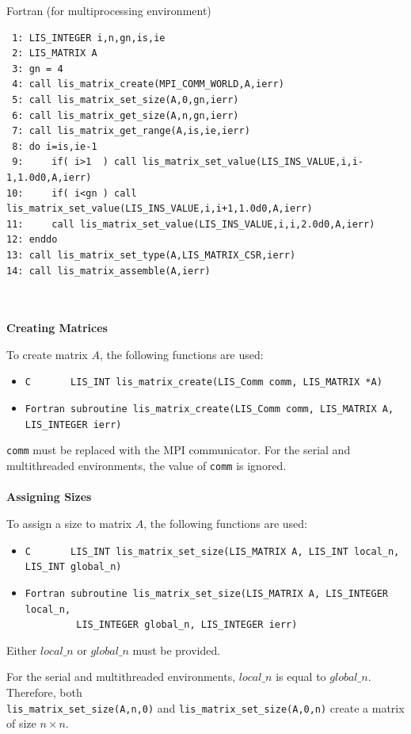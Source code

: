 \documentclass[a4paper]{article}
\begin{document}
\begin{itembox}[l]{Fortran (for multiprocessing environment)}
\small
\begin{verbatim}
 1: LIS_INTEGER i,n,gn,is,ie                 
 2: LIS_MATRIX A
 3: gn = 4
 4: call lis_matrix_create(MPI_COMM_WORLD,A,ierr)
 5: call lis_matrix_set_size(A,0,gn,ierr)
 6: call lis_matrix_get_size(A,n,gn,ierr)
 7: call lis_matrix_get_range(A,is,ie,ierr)
 8: do i=is,ie-1
 9:     if( i>1  ) call lis_matrix_set_value(LIS_INS_VALUE,i,i-1,1.0d0,A,ierr)
10:     if( i<gn ) call lis_matrix_set_value(LIS_INS_VALUE,i,i+1,1.0d0,A,ierr)
11:     call lis_matrix_set_value(LIS_INS_VALUE,i,i,2.0d0,A,ierr)
12: enddo
13: call lis_matrix_set_type(A,LIS_MATRIX_CSR,ierr)
14: call lis_matrix_assemble(A,ierr)
\end{verbatim}
\end{itembox}
\\ \\
\noindent
{\bf Creating Matrices}

To create matrix $A$, the following functions are used: 
\begin{itemize}
\item \verb|C       LIS_INT lis_matrix_create(LIS_Comm comm, LIS_MATRIX *A)|
\item \verb|Fortran subroutine lis_matrix_create(LIS_Comm comm, LIS_MATRIX A, LIS_INTEGER ierr)|
\end{itemize}
{\tt comm} must be replaced with the MPI communicator. 
For the serial and multithreaded environments, the value of {\tt comm} is ignored.
\\ \\
\noindent
{\bf Assigning Sizes}

To assign a size to matrix $A$, the following functions are used: 
\begin{itemize}
\item \verb|C       LIS_INT lis_matrix_set_size(LIS_MATRIX A, LIS_INT local_n, LIS_INT global_n)|
\item \verb|Fortran subroutine lis_matrix_set_size(LIS_MATRIX A, LIS_INTEGER local_n,|\\
      \verb|         LIS_INTEGER global_n, LIS_INTEGER ierr)|
\end{itemize}
Either $local\_n$ or $global\_n$ must be provided. 

For the serial and multithreaded environments, $local\_n$ is
equal to $global\_n$. 
Therefore, both \\
\verb|lis_matrix_set_size(A,n,0)| and \verb|lis_matrix_set_size(A,0,n)|
create a matrix of size $n \times n$.
\end{document}
